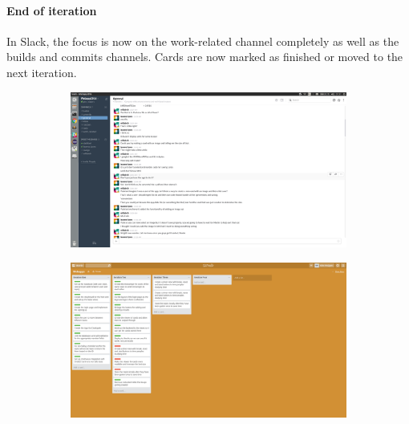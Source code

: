 \documentclass[a4wide, 10pt]{article}
\begin{document}
\paragraph{End of iteration}
In Slack, the focus is now on the work-related channel completely as well as the builds and commits channels.  Cards are now marked as finished or moved to the next iteration.
\begin{figure}[h]
\centering
\begin{subfigure}{.5\textwidth}
  \centering
  	\includegraphics[scale=0.1]{slackend.png} 
  \label{fig:sub1}
\end{subfigure}%
\begin{subfigure}{.5\textwidth}
  \centering
  	\includegraphics[scale=0.1]{iterationlast.png}  
  \label{fig:sub2}
\end{subfigure}
\label{fig:test}
\end{figure}
\end{document}
